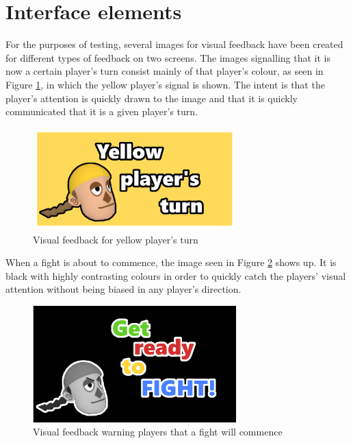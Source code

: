 \section{Interface elements}
For the purposes of testing, several images for visual feedback have been created for different types of feedback on two screens. The images signalling that it is now a certain player's turn consist mainly of that player's colour, as seen in Figure \ref{fig:yellow_turn}, in which the yellow player's signal is shown. The intent is that the player's attention is quickly drawn to the image and that it is quickly communicated that it is a given player's turn.

\begin{figure}[h!]
	\centering
	\includegraphics[width=0.7\textwidth]{figures/yellowturn.png}
	\caption{Visual feedback for yellow player's turn}
	\label{fig:yellow_turn}
\end{figure}

When a fight is about to commence, the image seen in Figure \ref{fig:get_ready} shows up. It is black with highly contrasting colours in order to quickly catch the players' visual attention without being biased in any player's direction.

\begin{figure}[h!]
	\centering
	\includegraphics[width=0.7\textwidth]{figures/getready.png}
	\caption{Visual feedback warning players that a fight will commence}
	\label{fig:get_ready}
\end{figure}

